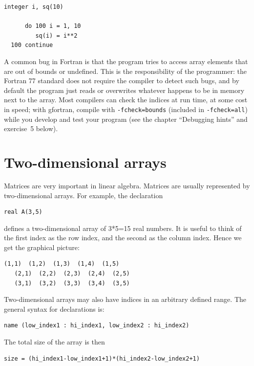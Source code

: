 \begin{lstlisting}[style=fortran77]
      integer i, sq(10)

      do 100 i = 1, 10
         sq(i) = i**2
  100 continue
\end{lstlisting}

A common bug in Fortran is that the program tries to access array elements that are out of bounds or undefined. This is the responsibility of the programmer: the Fortran 77 standard does not require the compiler to detect such bugs, and by default the program just reads or overwrites whatever happens to be in memory next to the array. Most compilers can check the indices at run time, at some cost in speed; with gfortran, compile with \texttt{-fcheck=bounds} (included in \texttt{-fcheck=all}) while you develop and test your program (see the chapter ``Debugging hints'' and exercise~5 below).

\section{Two-dimensional arrays}

Matrices are very important in linear algebra. Matrices are usually represented by two-dimensional arrays. For example, the declaration

\begin{lstlisting}[style=fortran77]
      real A(3,5)
\end{lstlisting}

defines a two-dimensional array of 3*5=15 real numbers. It is useful to think of the first index as the row index, and the second as the column index. Hence we get the graphical picture:

\begin{lstlisting}[style=fortran77]
   (1,1)  (1,2)  (1,3)  (1,4)  (1,5)
   (2,1)  (2,2)  (2,3)  (2,4)  (2,5)
   (3,1)  (3,2)  (3,3)  (3,4)  (3,5)
\end{lstlisting}

Two-dimensional arrays may also have indices in an arbitrary defined range. The general syntax for declarations is:

\begin{lstlisting}[style=fortran77]
     name (low_index1 : hi_index1, low_index2 : hi_index2)
\end{lstlisting}

The total size of the array is then

\begin{lstlisting}[style=fortran77]
     size = (hi_index1-low_index1+1)*(hi_index2-low_index2+1)
\end{lstlisting}

